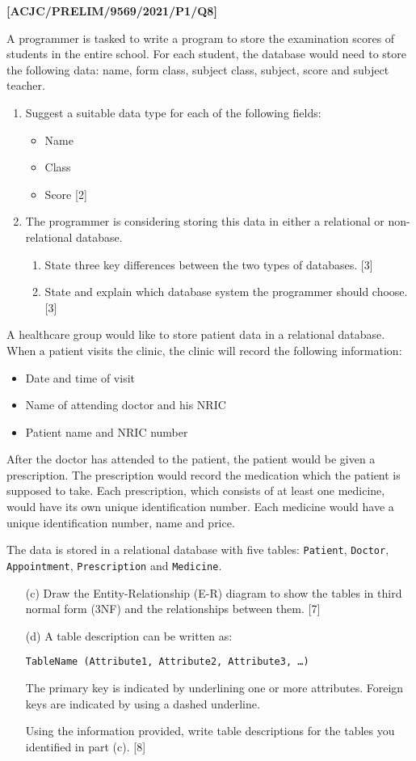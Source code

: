 \item \textbf{{[}ACJC/PRELIM/9569/2021/P1/Q8{]} }

A programmer is tasked to write a program to store the examination
scores of students in the entire school. For each student, the database
would need to store the following data: name, form class, subject
class, subject, score and subject teacher.
\begin{enumerate}
\item Suggest a suitable data type for each of the following fields: 
\begin{itemize}
\item Name 
\item Class 
\item Score \hfill{}{[}2{]}
\end{itemize}
\item The programmer is considering storing this data in either a relational
or non-relational database.
\begin{enumerate}
\item State three key differences between the two types of databases. \hfill{}{[}3{]}
\item State and explain which database system the programmer should choose.
\hfill{}{[}3{]}
\end{enumerate}
\end{enumerate}
A healthcare group would like to store patient data in a relational
database. When a patient visits the clinic, the clinic will record
the following information:
\begin{itemize}
\item Date and time of visit 
\item Name of attending doctor and his NRIC 
\item Patient name and NRIC number
\end{itemize}
After the doctor has attended to the patient, the patient would be
given a prescription. The prescription would record the medication
which the patient is supposed to take. Each prescription, which consists
of at least one medicine, would have its own unique identification
number. Each medicine would have a unique identification number, name
and price. 

The data is stored in a relational database with five tables: \texttt{Patient},
\texttt{Doctor}, \texttt{Appointment}, \texttt{Prescription} and \texttt{Medicine}.
\begin{enumerate}
\item[(c)]  Draw the Entity-Relationship (E-R) diagram to show the tables in
third normal form (3NF) and the relationships between them. \hfill{}{[}7{]}
\item[(d)]  A table description can be written as:

\texttt{TableName (Attribute1, Attribute2, Attribute3, \dots )}

The primary key is indicated by underlining one or more attributes.
Foreign keys are indicated by using a dashed underline.

Using the information provided, write table descriptions for the tables
you identified in part (c). \hfill{}{[}8{]}
\end{enumerate}